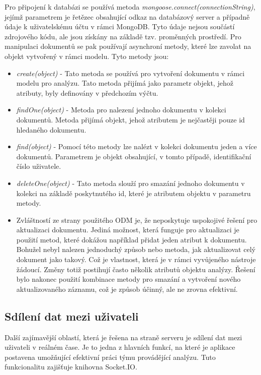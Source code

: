 Pro připojení k databázi se používá metoda \textit{mongoose.connect(connectionString)}, jejímž parametrem je řetězec obsahující odkaz na databázový server a případně údaje k uživatelskému účtu v rámci MongoDB. Tyto údaje nejsou součástí zdrojového kódu, ale jsou získány na základě tzv. proměnných prostředí. Pro manipulaci dokumentů se pak používají asynchroní metody, které lze zavolat na objekt vytvořený v rámci modelu. Tyto metody jsou: 
    
\begin{itemize}
    \item \textit{create(object)} - Tato metoda se používá pro vytvoření dokumentu v rámci modelu pro analýzu. Tato metoda přijímá jako parametr objekt, jehož atributy, byly definovány v předchozím výčtu. 
    \item \textit{findOne(object)} - Metoda pro nalezení jednoho dokumentu v kolekci dokumentů. Metoda přijímá objekt, jehož atributem je nejčastěji pouze id hledaného dokumentu. 
    \item \textit{find(object)} - Pomocí této metody lze nalézt v kolekci dokumentu jeden a více dokumentů. Parametrem je objekt obsahující, v tomto případě, identifikační číslo uživatele.   
    \item \textit{deleteOne(object)} - Tato metoda slouží pro smazání jednoho dokumentu v kolekci na základě poskytnutého id, které je atributem objektu v parametru metody. 
    \item Zvláštností ze strany použitého ODM je, že neposkytuje uspokojivé řešení pro aktualizaci dokumentu. Jediná možnost, která funguje pro aktualizaci je použití metod, které dokážou například přidat jeden atribut k dokumentu. Bohužel nebyl nalezen jednoduchý způsob nebo metoda, jak aktualizovat celý dokument jako takový. Což je vlastnost, která je v rámci vyvůjeného nástroje žádoucí. Změny totiž postihují často několik atributů objektu analýzy. Řešení bylo nakonec použití kombinace metody pro smazání a vytvoření nového aktualizovaného záznamu, což je způsob účinný, ale ne zrovna efektivní.  
\end{itemize}

\subsection{Sdílení dat mezi uživateli}
Další zajímavější oblastí, která je řešena na straně serveru je sdílení dat mezi uživateli v reálném čase. Je to jedna z hlavních funkcí, na které je aplikace postavena umožňující efektivní práci týmu provádějící analýzu. Tuto funkcionalitu zajišťuje knihovna Socket.IO. 

